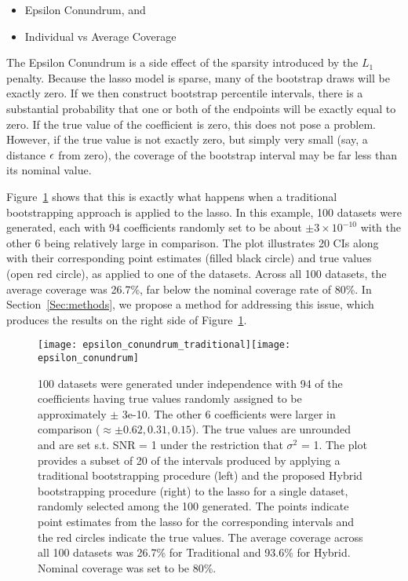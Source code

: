 \begin{itemize}
\item Epsilon Conundrum, and
\item Individual vs Average Coverage
\end{itemize}

The Epsilon Conundrum is a side effect of the sparsity introduced by the $L_1$ penalty. Because the lasso model is sparse, many of the bootstrap draws will be exactly zero. If we then construct bootstrap percentile intervals, there is a substantial probability that one or both of the endpoints will be exactly equal to zero. If the true value of the coefficient is zero, this does not pose a problem. However, if the true value is not exactly zero, but simply very small (say, a distance $\epsilon$ from zero), the coverage of the bootstrap interval may be far less than its nominal value.

 

Figure~\ref{Fig:ec} shows that this is exactly what happens when a traditional bootstrapping approach is applied to the lasso. In this example, 100 datasets were generated, each with 94 coefficients randomly set to be about $\pm 3 \times 10^{-10}$ with the other 6 being relatively large in comparison. The plot illustrates 20 CIs along with their corresponding point estimates (filled black circle) and true values (open red circle), as applied to one of the datasets.  Across all 100 datasets, the average coverage was 26.7\%, far below the nominal coverage rate of 80\%. In Section~\ref{Sec:methods}, we propose a method for addressing this issue, which produces the results on the right side of Figure~\ref{Fig:ec}.

\begin{figure}[hbtp]
  \begin{center}
    \texttt{[image: epsilon\_conundrum\_traditional]}\texttt{[image: epsilon\_conundrum]}
    \caption{\label{Fig:ec} 100 datasets were generated under independence with 94 of the coefficients having true values randomly assigned to be approximately $\pm$ 3e-10. The other 6 coefficients were larger in comparison ($\approx \pm 0.62, 0.31, 0.15$). The true values are unrounded and are set s.t. SNR = 1 under the restriction that $\sigma^2$ = 1. The plot provides a subset of 20 of the intervals produced by applying a traditional bootstrapping procedure (left) and the proposed Hybrid bootstrapping procedure (right) to the lasso for a single dataset, randomly selected among the 100 generated. The points indicate point estimates from the lasso for the corresponding intervals and the red circles indicate the true values. The average coverage across all 100 datasets was 26.7\% for Traditional and 93.6\% for Hybrid. Nominal coverage was set to be 80\%.}
  \end{center}
\end{figure}

